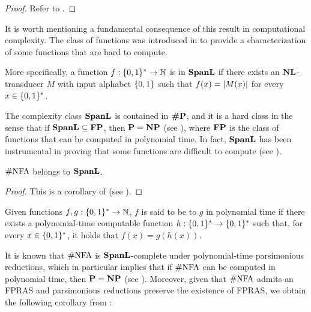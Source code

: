 \documentclass[11pt,twoside=off,numbers=noenddot]{scrbook}
\begin{document}
\begin{proof}
    Refer to .
\end{proof}

It is worth mentioning a fundamental consequence of this result in computational complexity. The class of functions \vocab{$\SpanL$} was introduced in \cite{alvarez1993very} to provide a characterization of some functions that are hard to compute.

\begin{definition}[$\SpanL$]
    More specifically, a function $f : \{ 0, 1 \}^\ast \to \mathbb N$ is in $\SpanL$ if there exists an $\textbf{NL}$-transducer $M$ with input alphabet $\{ 0, 1 \}$ such that $f(x) = | M(x) |$ for every $x \in \{ 0, 1 \}^\ast$.
\end{definition}

The complexity class $\SpanL$ is contained in $\textbf{\#P}$, and it is a hard class in the sense that if $\textbf{SpanL} \subseteq \textbf{FP}$, then $\textbf{P} = \textbf{NP}$ (see \cite{alvarez1993very}), where $\textbf{FP}$ is the class of functions that can be computed in polynomial time. In fact, $\SpanL$ has been instrumental in proving that some functions are difficult to compute (see \cite{alvarez1993very,arenas2012counting,hemaspaandra1995satanic,losemann2013complexity}).

\begin{lemma}
    $\text{\#NFA}$ belongs to $\SpanL$.
\end{lemma}

\begin{proof}
    This is a corollary of  (see \cite{alvarez1993very}).
\end{proof}

\begin{definition}
    Given functions $f, g : \{ 0, 1 \}^\ast \to \mathbb N$, $f$ is said to be  to $g$ in polynomial time if there exists a polynomial-time computable function $h : \{ 0, 1 \}^\ast \to \{ 0, 1 \}^\ast$ such that, for every $x \in \{ 0, 1 \}^\ast$, it holds that $f(x) = g(h(x))$.
\end{definition}

It is known that $\text{\#NFA}$ is $\SpanL$-complete under polynomial-time parsimonious reductions, which in particular implies that if $\text{\#NFA}$ can be computed in polynomial time, then $\textbf{P} = \textbf{NP}$ (see \cite{alvarez1993very}). Moreover, given that $\text{\#NFA}$ admits an FPRAS and parsimonious reductions preserve the existence of FPRAS, we obtain the following corollary from :
\end{document}
